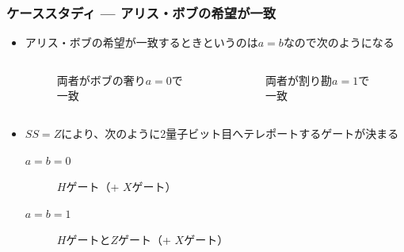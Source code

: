 \begin{frame}
  \frametitle{ケーススタディ --- アリス・ボブの希望が一致}

  \begin{itemize}
    \item アリス・ボブの希望が一致するときというのは$a = b$なので次のようになる
    \begin{columns}
      \begin{column}{0.5\textwidth}
        \begin{figure}
          \centering
          \vspace{2ex}
          \caption{両者がボブの奢り$a = 0$で一致}
          \label{fig:a_equal_0}
        \end{figure}
      \end{column}
      \begin{column}{0.5\textwidth}
        \begin{figure}
          \centering
          \caption{両者が割り勘$a = 1$で一致}
          \label{fig:a_equal_1}
        \end{figure}
      \end{column}
    \end{columns}

    \item $SS = Z$により、次のように2量子ビット目へテレポートするゲートが決まる
    \begin{description}
      \item[$a = b = 0$] $H$ゲート（+ $X$ゲート）
      \item[$a = b = 1$] $H$ゲートと$Z$ゲート（+ $X$ゲート）
    \end{description}
  \end{itemize}

\end{frame}

